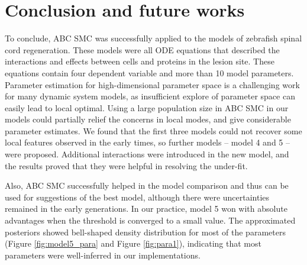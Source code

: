 \chapter{Conclusion and future works}




 To conclude, ABC SMC was successfully applied to the models of zebrafish spinal cord regeneration. These models were all ODE equations that described the interactions and effects between cells and proteins in the lesion site. These equations contain four dependent variable and more than 10 model parameters.  Parameter estimation for high-dimensional parameter space is a challenging work for many dynamic system models, as insufficient explore of parameter space can easily lead to local optimal. Using a large population size in ABC SMC in our models could partially relief the concerns in local modes, and give considerable parameter estimates. We found that the first three models could not recover some local features observed in the early times, so further models -- model 4 and 5 -- were proposed. Additional interactions were introduced in the new model, and the results proved that they were helpful in resolving the under-fit.
 
 Also, ABC SMC successfully helped in the model comparison and thus can be used for suggestions of the best model, although there were uncertainties remained in the early generations. In our practice, model 5 won with absolute advantages when the threshold is converged to a small value. The approximated posteriors showed bell-shaped density distribution for most of the parameters (Figure \ref{fig:model5_para} and Figure \ref{fig:para1}), indicating that most parameters were well-inferred in our implementations.



